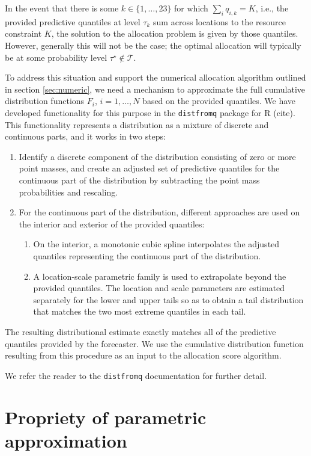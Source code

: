 \documentclass{article}
\begin{document}
In the event that there is some $k \in \{1, \ldots, 23\}$ for which $\sum_i q_{i,k} = K$, i.e., the provided predictive quantiles at level $\tau_k$ sum across locations to the resource constraint $K$, the solution to the allocation problem is given by those quantiles. However, generally this will not be the case; the optimal allocation will typically be at some probability level $\tau^\star \notin \mathcal{T}$.

To address this situation and support the numerical allocation algorithm outlined in section \ref{sec:numeric}, we need a mechanism to approximate the full cumulative distribution functions $F_i$, $i = 1, \ldots, N$ based on the provided quantiles. We have developed functionality for this purpose in the \verb`distfromq` package for R (cite). This functionality represents a distribution as a mixture of discrete and continuous parts, and it works in two steps:
\begin{enumerate}
  \item Identify a discrete component of the distribution consisting of zero or more point masses, and create an adjusted set of predictive quantiles for the continuous part of the distribution by subtracting the point mass probabilities and rescaling.
  \item For the continuous part of the distribution, different approaches are used on the interior and exterior of the provided quantiles:
  \begin{enumerate}
    \item On the interior, a monotonic cubic spline interpolates the adjusted quantiles representing the continuous part of the distribution.
    \item A location-scale parametric family is used to extrapolate beyond the provided quantiles. The location and scale parameters are estimated separately for the lower and upper tails so as to obtain a tail distribution that matches the two most extreme quantiles in each tail.
  \end{enumerate}
\end{enumerate}
The resulting distributional estimate exactly matches all of the predictive quantiles provided by the forecaster. We use the cumulative distribution function resulting from this procedure as an input to the allocation score algorithm.

We refer the reader to the \verb`distfromq` documentation for further detail.


\section{Propriety of parametric approximation} %
\label{sec:propriety_of_parametric_approximation}
\end{document}
